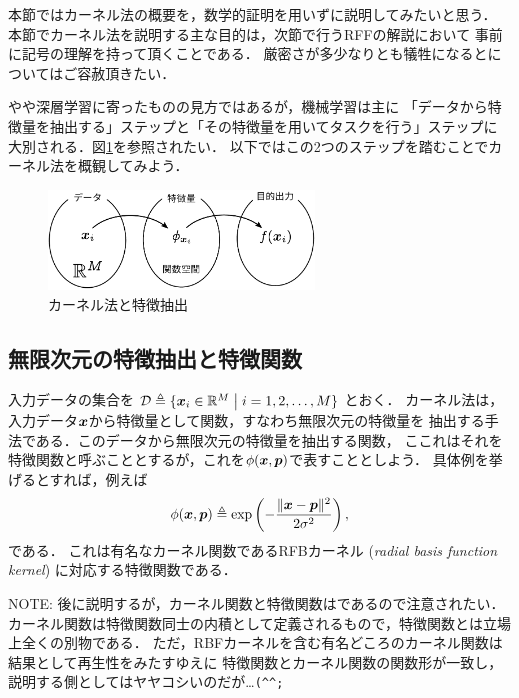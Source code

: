 %

本節ではカーネル法の概要を，数学的証明を用いずに説明してみたいと思う．
本節でカーネル法を説明する主な目的は，次節で行うRFFの解説において
事前に記号の理解を持って頂くことである．
厳密さが多少なりとも犠牲になるとについてはご容赦頂きたい．

やや深層学習に寄ったものの見方ではあるが，機械学習は主に
「データから特徴量を抽出する」ステップと「その特徴量を用いてタスクを行う」ステップに
大別される．図\ref{fig:kernel_method_and_feature_extraction}を参照されたい．
以下ではこの2つのステップを踏むことでカーネル法を概観してみよう．

\begin{figure}[t]
    \centerline{\includegraphics[width=200pt]{figures/kernel_method_and_feature_extraction.pdf}}
    \caption{カーネル法と特徴抽出}
    \label{fig:kernel_method_and_feature_extraction}
\end{figure}

\subsection{無限次元の特徴抽出と特徴関数}

入力データの集合を
$\mathcal{D} \triangleq \{ \boldsymbol{x}_i \in \mathbb{R}^{M} \bigm| i = 1, 2, \ldots, M \}$
とおく．
カーネル法は，入力データ$\boldsymbol{x}$から特徴量として関数，すなわち無限次元の特徴量を
抽出する手法である．このデータから無限次元の特徴量を抽出する関数，
ここれはそれを特徴関数と呼ぶこととするが，これを$\phi(\boldsymbol{x}, \boldsymbol{p})$で表すこととしよう．
具体例を挙げるとすれば，例えば
\begin{equation}
    \phi(\boldsymbol{x}, \boldsymbol{p}) \triangleq \exp \left( - \frac{\|\boldsymbol{x} - \boldsymbol{p}\|^2}{2 \sigma^2} \right),
    \label{eqn:feature_rbf}
\end{equation}
である．
これは有名なカーネル関数であるRFBカーネル (\textit{radial basis function kernel}) に対応する特徴関数である．
\begin{displayquote}\footnotesize\textsf{NOTE:}
後に説明するが，カーネル関数と特徴関数はであるので注意されたい．
カーネル関数は特徴関数同士の内積として定義されるもので，特徴関数とは立場上全くの別物である．
ただ，RBFカーネルを含む有名どころのカーネル関数は結果として再生性をみたすゆえに
特徴関数とカーネル関数の関数形が一致し，説明する側としてはヤヤコシいのだが\ldots \verb|(^^;|
\end{displayquote}

